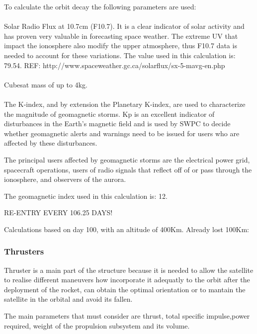 To calculate the orbit decay the following parameters are used:
\paragraph{}Solar Radio Flux at 10.7cm (F10.7). It is a clear indicator of solar activity and has proven very valuable in forecasting space weather. The extreme UV that impact the ionosphere also modify the upper atmosphere, thus F10.7 data is needed to account for these variations. The value used in this calculation is: 79.54.
REF: http://www.spaceweather.gc.ca/solarflux/sx-5-mavg-en.php

\paragraph{}Cubesat mass of up to 4kg.

\paragraph{}The K-index, and by extension the Planetary K-index, are used to characterize the magnitude of geomagnetic storms. Kp is an excellent indicator of disturbances in the Earth's magnetic field and is used by SWPC to decide whether geomagnetic alerts and warnings need to be issued for users who are affected by these disturbances.

The principal users affected by geomagnetic storms are the electrical power grid, spacecraft operations, users of radio signals that reflect off of or pass through the ionosphere, and observers of the aurora.

The geomagnetic index used in this calculation is: 12.

RE-ENTRY EVERY 106.25 DAYS!

Calculations based on day 100, with an altitude of 400Km. Already lost 100Km:

\subsubsection{Thrusters}

Thruster is a main part of the structure because it is needed to allow the satellite to realise different maneuvers how incorporate it adequatly to the orbit after the deployment of the rocket, can obtain the optimal orientation or to mantain the satellite in the orbital and avoid its fallen. 

The main parameters that must consider are thrust, total specific impulse,power required, weight of the  propulsion subsystem and its volume.

